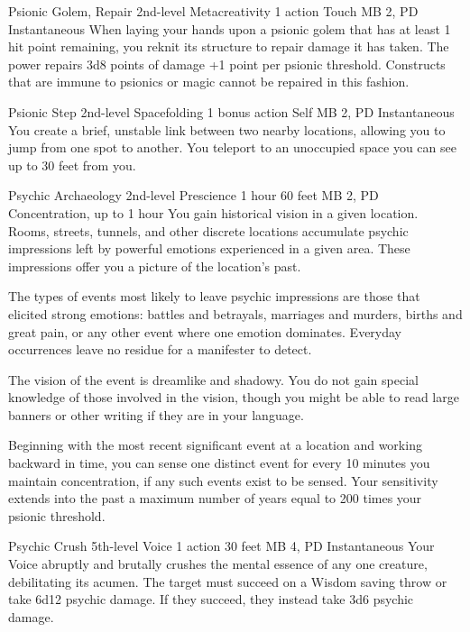 \DndPowerHeader%
  {Psionic Golem, Repair}
  {2nd-level Metacreativity}
  {1 action}
  {Touch}
  {MB 2, PD \lvltwo}
  {Instantaneous}
  When laying your hands upon a psionic golem
  that has at least 1 hit point remaining,
  you reknit its structure to repair damage it has taken.
  The power repairs 3d8 points of damage
  +1 point per psionic threshold.
  Constructs that are immune to psionics or magic
  cannot be repaired in this fashion.

\DndPowerHeader%
  {Psionic Step}
  {2nd-level Spacefolding}
  {1 bonus action}
  {Self}
  {MB 2, PD \lvltwo}
  {Instantaneous}
You create a brief, unstable link between two nearby locations,
allowing you to jump from one spot to another.
You teleport to an unoccupied space you can see
up to 30 feet from you.

\DndPowerHeader%
  {Psychic Archaeology}
  {2nd-level Prescience}
  {1 hour}
  {60 feet}
  {MB 2, PD \lvltwo}
  {Concentration, up to 1 hour}
  You gain historical vision in a given location.
  Rooms, streets, tunnels, and other discrete locations
  accumulate psychic impressions left by powerful emotions
  experienced in a given area.
  These impressions offer you a picture of the location's past.

  The types of events most likely to leave
  psychic impressions are those that elicited strong emotions:
  battles and betrayals,
  marriages and murders,
  births and great pain,
  or any other event where one emotion dominates.
  Everyday occurrences leave no residue for a manifester to detect.
  
  The vision of the event is dreamlike and shadowy.
  You do not gain special knowledge of those involved in the vision,
  though you might be able to read large banners
  or other writing if they are in your language.
  
  Beginning with the most recent significant event
  at a location and working backward in time,
  you can sense one distinct event for every 10 minutes
  you maintain concentration,
  if any such events exist to be sensed.
  Your sensitivity extends into the past
  a maximum number of years equal to
  200 times your psionic threshold.

\DndPowerHeader%
  {Psychic Crush}
  {5th-level Voice}
  {1 action}
  {30 feet}
  {MB 4, PD \lvlfive}
  {Instantaneous}
Your Voice abruptly and brutally crushes the mental essence
of any one creature, debilitating its acumen.
The target must succeed on a Wisdom saving throw
or take 6d12 psychic damage.
If they succeed, they instead take 3d6 psychic damage.


